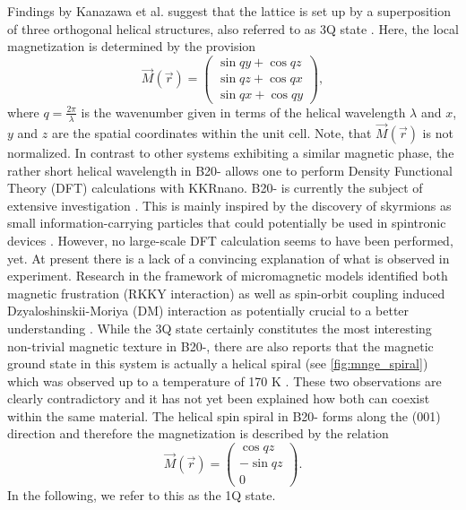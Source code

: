 \documentclass[graybox]{svmult}
\newcommand{\beq}{\begin{equation}}
\newcommand{\eeq}{\end{equation}}
\begin{document}
Findings by Kanazawa et al. suggest that the lattice is set up by a superposition of three orthogonal
helical structures, also referred to as 3Q state \cite{kanazawa_noncentrosymmetric_2017}. 
Here, the local magnetization is determined by the provision
\beq
\label{eq:3q_formula}
\vec{M}(\vec{r}) =
\begin{pmatrix}
	\sin{qy} + \cos{qz} \\
	\sin{qz} + \cos{qx} \\
	\sin{qx} + \cos{qy}
\end{pmatrix},
\eeq
where $q=\frac{2\pi}{\lambda}$ is the wavenumber given in terms of the helical wavelength $\lambda$ and
$x$, $y$ and $z$ are the spatial coordinates within the unit cell.
Note, that $\vec{M}(\vec{r})$ is not normalized.
In contrast to other systems exhibiting a
similar magnetic phase, the rather short helical wavelength in B20- allows one to perform
Density Functional Theory (DFT) 
calculations with KKRnano.
B20- is currently the subject of extensive
investigation
\cite{kanazawa_large_2011,kanazawa_possible_2012,grigoriev_chiral_2013,tanigaki_real-space_2015,martin_magnetic_2016}.
This is mainly inspired by the discovery of skyrmions as small information-carrying particles
that could potentially be used in spintronic devices \cite{fert_magnetic_2017}.
However, no large-scale DFT calculation seems to have been performed, yet.
At present there is a lack of a convincing explanation
of what is observed in experiment. Research in the framework of micromagnetic models identified both
magnetic frustration (RKKY interaction) as well as spin-orbit coupling induced Dzyaloshinskii-Moriya (DM)
interaction as potentially crucial to a better
understanding \cite{altynbaev_hidden_2016,koretsune_control_2015}. 
While the 3Q state certainly constitutes the most interesting non-trivial magnetic texture 
in B20-, there are also reports that the magnetic ground state in this system is
actually a helical spiral (see \cref{fig:mnge_spiral}) \cite{yaouanc_magnetic_2017} which was observed up
to a temperature of 170 K \cite{makarova_neutron_2012}.
These two observations are clearly contradictory and it has not yet been explained how
both can coexist within the same material.
The helical spin spiral in B20- forms along the (001) direction and therefore the magnetization
is described by the relation
\beq
\label{eq:1q_spiral}
\vec{M}(\vec{r}) =
\begin{pmatrix}
	 \cos{qz} \\
	-\sin{qz}  \\
	0
\end{pmatrix}
.
\eeq
In the following, we refer to this as the 1Q state.
\end{document}
